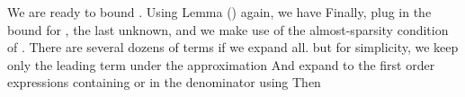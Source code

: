 We are ready to bound .
Using Lemma () again, we have
Finally, plug in the bound for , the last unknown, and we make use of the almost-sparsity condition of .
There are several dozens of terms if we expand all.
but for simplicity, we keep only the leading term under the approximation
And expand to the first order expressions containing  or  in the denominator using
Then

\color[red]{(To be done)}

\stopchapter
